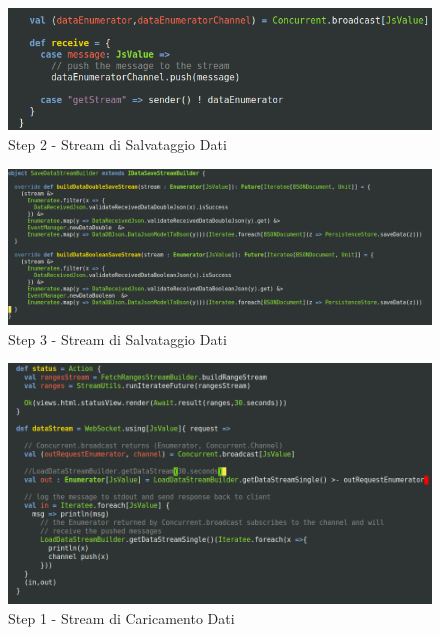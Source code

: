 \begin{figure}[h]
\centering
\includegraphics[scale=0.5,natwidth=610,natheight=642]{Figures/Project/Server/Interaction/SaveDataStream/DataStream2.png}
\caption{Step 2 - Stream di Salvataggio Dati}
\label{SaveDataStream2}
\end{figure}

\begin{figure}[h]
\centering
\includegraphics[scale=0.3,natwidth=610,natheight=642]{Figures/Project/Server/Interaction/SaveDataStream/DataStream3.png}
\caption{Step 3 - Stream di Salvataggio Dati}
\label{SaveDataStream3}
\end{figure}

\begin{figure}[h]
\centering
\includegraphics[scale=0.3,natwidth=610,natheight=642]{Figures/Project/Server/Interaction/LoadDataStream/LoadDataStream1.png}
\caption{Step 1 - Stream di Caricamento Dati}
\label{LoadDataStream1}
\end{figure}

